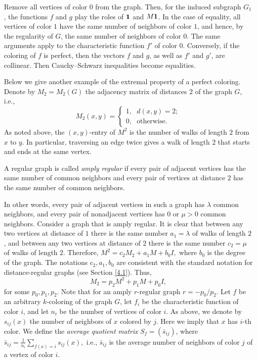 \documentclass[11pt]{article}
\theoremstyle{definition}
\begin{document}
Remove all vertices of color $0$ from the graph. Then, for the induced
subgraph $G_1$, the functions $f$ and $g$ play the roles of ${\bf1}$ and
$M{\bf1}$. In the case of equality, all vertices of color $1$ have the same
number of neighbors of color $1$, and hence, by the regularity of  $G$,
the same number of neighbors of color $0$. The same  arguments apply to the
characteristic function $f'$ of color $0$. Conversely, if
the coloring of $f$ is perfect, then the vectors $f$ and $g$, as well as $f'$ and $g'$,
are collinear. Then Cauchy--Schwarz inequalities become  equalities.


Below we give another example of the extremal property of a perfect coloring.
Denote by $M_2=M_2(G)$ the  adjacency matrix of  distances  $2$  of the graph $G$,
i.e.,
\[
M_2(x,y)=\left\{
\begin{array}{ll}
1\mbox{,} & d(x,y)=2;\\
0\mbox{,} & \mbox{otherwise.}
\end{array}
\right.
\]
As noted above, the  $(x,y)$-entry of $M^2$ is the 
 number of walks of length $2$ from $x$ to $y$. In particular, traversing
an edge twice gives a walk of length $2$ that starts and ends at the same vertex.


A regular graph is called {\sl amply regular} if every pair of  adjacent
vertices has the same number of common neighbors and every pair of vertices at
distance $2$  has the same number of common neighbors.

In other words, every pair of adjacent vertices in such a graph has $\lambda$
common neighbors, and every pair of nonadjacent vertices has $0$ or $\mu>0$ common
neighbors. Consider a graph that is amply regular. It is clear that
between any two vertices at  distance of $1$ there is the same number
$a_1=\lambda$ of walks of length $2$, and between any two vertices at  distance of $2$ there is the same number $c_2=\mu$ of walks of length $2$. Therefore,
$M^2=c_{2}M_{2}+ a_1M+ b_0I, $ where $b_0$
is the degree of the graph. The notations $c_2,a_1,b_0$ are consistent with
the standard notation for distance-regular graphs (see
Section \ref{4.1}). Thus, 
\begin{equation}\label{e1.2}
M_2=p_2M^2+p_1M+p_0I, 
\end{equation}
for
some $p_0,p_1,p_2$.  Note that for an amply $r$-regular graph $r=-p_0/p_2$. Let $f$ be an arbitrary $k$-coloring of the graph
$G$, let $f_i$ be the characteristic function of color $i$, and let $n_i$ be the number of vertices of color $i$. As above,  we denote by $s_{ij}(x)$  the number of neighbors of $x$  colored by $j$. Here we imply  that  $x$ has 
$i$-th color. We define the {\sl average quotient matrix} $S_f=({\bar s}_{ij})$, where $ {\bar s}_{ij}=
\frac{1}{n_i}\sum\limits_{f(x)=i} s_{ij}(x),$
 i.e.,  $\bar s_{ij}$ is the average number of neighbors  of color $j$ of  a vertex of color $i$.
\end{document}
